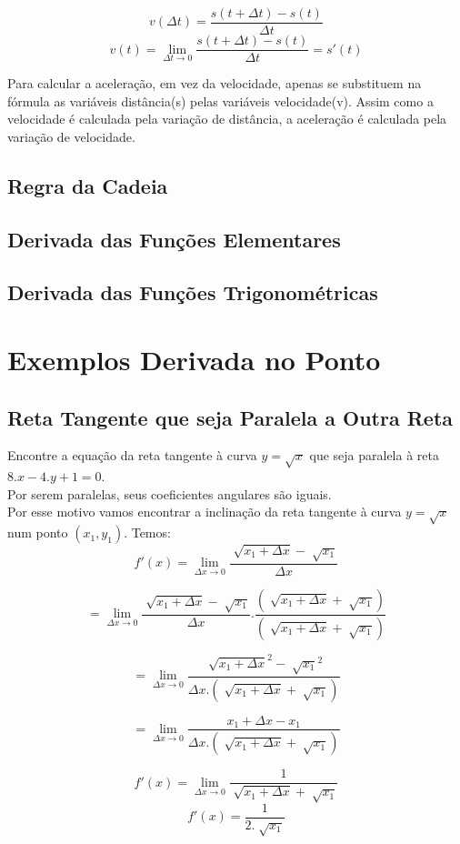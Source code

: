 \documentclass[ ]{article}
\begin{document}
		$$v(\Delta t) = \frac{s(t+\Delta t)-s(t)}{\Delta t}$$
		$$v(t) =\lim_{\Delta t\to 0}\frac{s(t+\Delta t)-s(t)}{\Delta t}= s'(t)$$
		
		Para calcular a aceleração, em vez da velocidade, apenas se substituem na fórmula as variáveis distância(s) pelas variáveis velocidade(v). Assim como a velocidade é calculada pela variação de distância, a aceleração é calculada pela variação de velocidade.
	
	\subsection{Regra da Cadeia}
	\subsection{Derivada das Funções Elementares}
	\subsection{Derivada das Funções Trigonométricas}
	
\newpage
\section{Exemplos Derivada no Ponto}
	\subsection{Reta Tangente que seja Paralela a Outra Reta}	
		Encontre a equação da reta tangente à curva $y = \sqrt{x}$ que seja paralela à reta $8.x - 4.y + 1 = 0$.\\
		Por serem paralelas, seus coeficientes angulares são iguais.\\
		Por esse motivo vamos encontrar a inclinação da reta tangente à curva $y = \sqrt{x}$ num ponto $(x_1,y_1)$. Temos:
		$$f'(x) = \lim_{\Delta x\to 0}\dfrac{\sqrt[]{x_1 + \Delta x}-\sqrt[ ]{x_1}}{\Delta x}$$

		$$= \lim_{\Delta x\to 0}\dfrac{\sqrt[]{x_1 + \Delta x}-\sqrt[ ]{x_1}}{\Delta x}.\dfrac{(\sqrt[ ]{x_1+\Delta x}+\sqrt[ ]{x_1})}{(\sqrt[ ]{x_1+\Delta x}+\sqrt[ ]{x_1})}$$

		$$= \lim_{\Delta x \to 0}\dfrac{\sqrt[ ]{x_1+\Delta x}^2-\sqrt[ ]{x_1}^2}  {\Delta x.(\sqrt[ ]{x_1 + \Delta x}+ \sqrt[ ]{x_1})}$$		
		
		$$= \lim_{\Delta x \to 0}\dfrac{x_1+\Delta x-x_1}{\Delta x.(\sqrt[ ]{x_1 + \Delta x}+ \sqrt[ ]{x_1})}$$
		
		$$f'(x) = \lim_{\Delta x\to 0}\dfrac{1}{\sqrt[ ]{x_1+\Delta x}+ \sqrt[ ]{x_1}}$$
		$$f'(x) = \dfrac{1}{2.\sqrt[ ]{x_1}}$$
		
\end{document}
